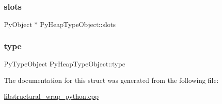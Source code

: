 \mbox{\label{struct_py_heap_type_object_a15212a8f85d939b3f4b133ecda1b62e5}} 
\subsubsection{\texorpdfstring{slots}{slots}}
{\footnotesize\ttfamily Py\+Object $\ast$ Py\+Heap\+Type\+Object\+::slots}

\mbox{\label{struct_py_heap_type_object_a8b961137de4ebeed5a5d2e4b47ee1ca7}} 
\subsubsection{\texorpdfstring{type}{type}}
{\footnotesize\ttfamily Py\+Type\+Object Py\+Heap\+Type\+Object\+::type}



The documentation for this struct was generated from the following file\+:\begin{DoxyCompactItemize}
\item 
\hyperlink{libstructural__wrap__python_8cpp}{libstructural\+\_\+wrap\+\_\+python.\+cpp}\end{DoxyCompactItemize}
